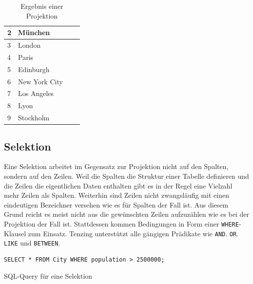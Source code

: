 \documentclass[a4paper]{article}
\begin{document}
\begin{minipage}{\textwidth}
\begin{minipage}[b]{0.49\textwidth}
\begin{table}[H]
\begin{tabular}{| l | l | l | l |}
   2 & München \\ \hline
   3 & London \\ \hline
   4 & Paris \\ \hline
   5 & Edinburgh \\ \hline
   6 & New York City \\ \hline
   7 & Los Angeles \\ \hline
   8 & Lyon \\ \hline
   9 & Stockholm \\ \hline
  \end{tabular}
\caption{Ergebnis einer Projektion}
\label{tab:projection}
\end{table}
\end{minipage}
\end{minipage}

\subsection{Selektion}
Eine Selektion arbeitet im Gegensatz zur Projektion nicht auf den Spalten, sondern auf den Zeilen. Weil die Spalten die Struktur einer Tabelle definieren und die Zeilen die eigentlichen Daten enthalten gibt es in der Regel eine Vielzahl mehr Zeilen als Spalten. Weiterhin sind Zeilen nicht zwangsläufig mit einen eindeutigen Bezeichner versehen wie es für Spalten der Fall ist. Aus diesem Grund reicht es meist nicht aus die gewünschten Zeilen aufzuzählen wie es bei der Projektion der Fall ist. Stattdessen kommen Bedingungen in Form einer \texttt{WHERE}-Klausel zum Einsatz. Tenzing unterstützt alle gängigen Prädikate wie \texttt{AND}. \texttt{OR}. \texttt{LIKE} und \texttt{BETWEEN}.

\begin{listing}[H]
\begin{verbatim}
SELECT * FROM City WHERE population > 2500000;
\end{verbatim}
\caption{SQL-Query für eine Selektion}
\label{lst:selection}
\end{listing}
\end{document}
